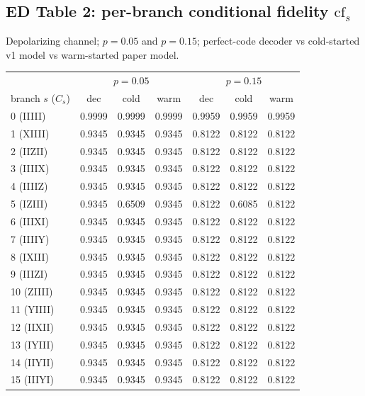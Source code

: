 \documentclass[10pt,a4paper]{article}
\begin{document}
\subsection*{ED Table 2: per-branch conditional fidelity $\mathrm{cf}_s$}
Depolarizing channel; $p=0.05$ and $p=0.15$; perfect-code decoder vs
cold-started v1 model vs warm-started paper model.
\begin{longtable}{lccc|ccc}
\toprule & \multicolumn{3}{c}{$p=0.05$} & \multicolumn{3}{c}{$p=0.15$} \\
branch $s$ ($C_s$) & dec & cold & warm & dec & cold & warm \\ \midrule
0 (IIIII) & 0.9999 & 0.9999 & 0.9999 & 0.9959 & 0.9959 & 0.9959 \\
1 (XIIII) & 0.9345 & 0.9345 & 0.9345 & 0.8122 & 0.8122 & 0.8122 \\
2 (IIZII) & 0.9345 & 0.9345 & 0.9345 & 0.8122 & 0.8122 & 0.8122 \\
3 (IIIIX) & 0.9345 & 0.9345 & 0.9345 & 0.8122 & 0.8122 & 0.8122 \\
4 (IIIIZ) & 0.9345 & 0.9345 & 0.9345 & 0.8122 & 0.8122 & 0.8122 \\
5 (IZIII) & 0.9345 & 0.6509 & 0.9345 & 0.8122 & 0.6085 & 0.8122 \\
6 (IIIXI) & 0.9345 & 0.9345 & 0.9345 & 0.8122 & 0.8122 & 0.8122 \\
7 (IIIIY) & 0.9345 & 0.9345 & 0.9345 & 0.8122 & 0.8122 & 0.8122 \\
8 (IXIII) & 0.9345 & 0.9345 & 0.9345 & 0.8122 & 0.8122 & 0.8122 \\
9 (IIIZI) & 0.9345 & 0.9345 & 0.9345 & 0.8122 & 0.8122 & 0.8122 \\
10 (ZIIII) & 0.9345 & 0.9345 & 0.9345 & 0.8122 & 0.8122 & 0.8122 \\
11 (YIIII) & 0.9345 & 0.9345 & 0.9345 & 0.8122 & 0.8122 & 0.8122 \\
12 (IIXII) & 0.9345 & 0.9345 & 0.9345 & 0.8122 & 0.8122 & 0.8122 \\
13 (IYIII) & 0.9345 & 0.9345 & 0.9345 & 0.8122 & 0.8122 & 0.8122 \\
14 (IIYII) & 0.9345 & 0.9345 & 0.9345 & 0.8122 & 0.8122 & 0.8122 \\
15 (IIIYI) & 0.9345 & 0.9345 & 0.9345 & 0.8122 & 0.8122 & 0.8122 \\
\bottomrule\end{longtable}
\end{document}
